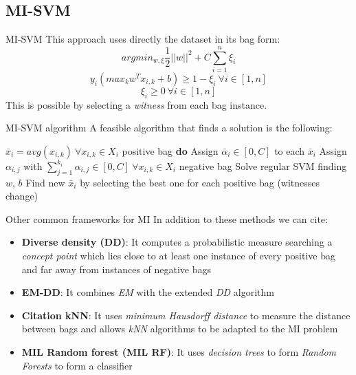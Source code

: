 \subsection{MI-SVM}
\begin{frame}{MI-SVM}
	This approach uses directly the dataset in its bag form:
	$$arg min_{w, \xi} \frac{1}{2} ||w||^2 + C \sum_{i = 1}^{n}\xi_i$$
	$$y_i (max_k w^T x_{i,k} + b) \geq 1 - \xi_i \ \forall i \in [1, n]$$
	$$\xi_i \geq 0 \ \forall i \in [1, n]$$
	This is possible by selecting a \textit{witness} from each bag instance.
\end{frame}

\begin{frame}{MI-SVM algorithm}
	A feasible algorithm that finds a solution is the following:
	
	\begin{codebox}
		\li $\bar{x}_i = avg(x_{i,k}) \ \forall x_{i,k} \in X_i$ positive bag
		\li \textbf{do} \Do
		\li Assign $\bar{\alpha}_i \in [0,C]$ to each $\bar{x}_i$
		\li Assign $\alpha_{i,j}$ with $\sum_{j=1}^{k_i}\alpha_{i,j} \in [0,C] \ \forall x_{i,k} \in X_i$ negative bag
		\li Solve regular SVM finding $w$, $b$
		\li Find new $\bar{x}_i$ by selecting the best one for each positive bag \End
		\li \While(witnesses change)
		
	\end{codebox}
	
\end{frame}

\begin{frame}{Other common frameworks for MI}
	In addition to these methods we can cite:
	\begin{itemize}
		\item \textbf{Diverse density (DD)}: It computes a probabilistic measure searching a \textit{concept point} which lies close to at least one instance of every positive bag and far away from instances of negative bags \cite{dd}
		\item \textbf{EM-DD}: It combines \textit{EM} \cite{em} with the extended \textit{DD} algorithm \cite{emdd}
		\item \textbf{Citation kNN}: It uses \textit{minimum Hausdorff distance} to measure the distance between bags and allows \textit{kNN} algorithms to be adapted to the MI problem \cite{miknn}
		\item \textbf{MIL Random forest (MIL RF)}: It uses \textit{decision trees} to form \textit{Random Forests} to form a classifier \cite{rdf} \cite{rf}
	\end{itemize}
	\begin{flushright}
		\cite{mbstar}
	\end{flushright}
\end{frame}

